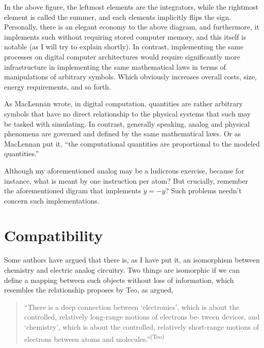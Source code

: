 In the above figure, the leftmost elements are the integrators, while the rightmost element is called the summer, and each elements implicitly flips the sign. Personally, there is an elegant economy to the above diagram, and furthermore, it implements such without requiring stored computer memory, and this itself is notable (as I will try to explain shortly). In contrast, implementing the same processes on digital computer architectures would require significantly more infrastructure in implementing the same mathematical laws in terms of manipulations of arbitrary symbols. Which obviously increases overall costs, size, energy requirements, and so forth.

As MacLennan wrote, in digital computation, quantities are rather arbitrary symbols that have no direct relationship to the physical systems that such may be tasked with simulating. In contrast, generally speaking, analog and physical phenomena are governed and defined by the same mathematical laws. Or as MacLennan put it, ``the computational quantities are proportional to the modeled quantities.''

Although my aforementioned analog may be a ludicrous exercise, because for instance, what is meant by one instruction per atom? But crucially, remember the aforementioned digram that implements $\ddot{y} = -y$? Such problems needn't concern such implementations.

\section*{Compatibility}

Some authors have argued that there is, as I have put it, an isomorphism between chemistry and electric analog circuitry. Two things are isomorphic if we can define a mapping between such objects without loss of information, which resembles the relationship proposes by Teo, as argued,
\begin{quotation}
    ``There is a deep connection between ‘electronics’, which is about the controlled, relatively long-range motions of electrons be- tween devices, and ‘chemistry’, which is about the controlled, relatively short-range motions of electrons between atoms and molecules.''\textsuperscript{(Teo)}
\end{quotation}

